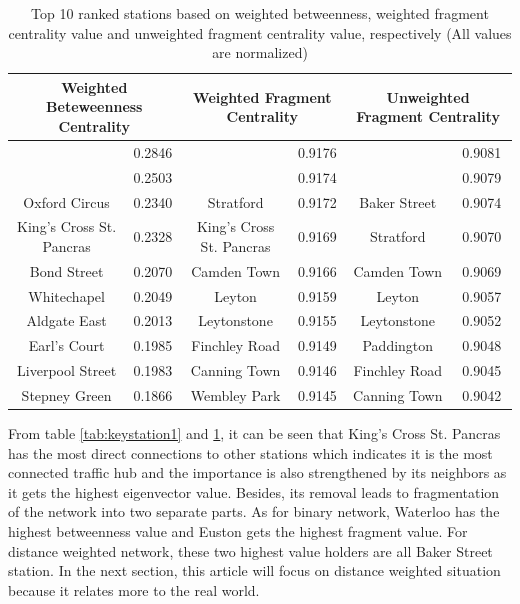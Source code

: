 \documentclass[a4paper,reqno,]{article}
\begin{document}
\begin{table}[H]
 \caption{Top 10 ranked stations based on weighted betweenness, weighted fragment centrality value and unweighted fragment centrality value, respectively (All values are normalized)}
 \label{tab:keystation2}
 \begin{center}
 \begin{tabular}{*{6}{c}}
  \toprule
  \multicolumn{2}{c}{Weighted Beteweenness Centrality} & \multicolumn{2}{c}{Weighted Fragment Centrality} & \multicolumn{2}{c}{Unweighted Fragment Centrality} \\
   \midrule
    \rowcolor{Gray}\cellcolor{Gray}{Baker Street} & 0.2846 & \cellcolor{Gray}{Baker Street} & 0.9176 & \cellcolor{Gray}{Euston} & 0.9081 \\
    \rowcolor{Gray}\cellcolor{Gray}{Bank}  & 0.2503 & \cellcolor{Gray}{Euston} & 0.9174 & \cellcolor{Gray}{King's Cross St. Pancras} & 0.9079 \\
    Oxford Circus & 0.2340 & Stratford & 0.9172 & Baker Street & 0.9074 \\
    King's Cross St. Pancras & 0.2328 & King's Cross St. Pancras & 0.9169 & Stratford & 0.9070 \\
    Bond Street & 0.2070 & Camden Town & 0.9166 & Camden Town & 0.9069 \\
    Whitechapel & 0.2049 & Leyton & 0.9159 & Leyton & 0.9057 \\
    Aldgate East & 0.2013 & Leytonstone & 0.9155 & Leytonstone & 0.9052 \\
    Earl's Court & 0.1985 & Finchley Road & 0.9149 & Paddington & 0.9048 \\
    Liverpool Street & 0.1983 & Canning Town & 0.9146 & Finchley Road & 0.9045 \\
    Stepney Green & 0.1866 & Wembley Park & 0.9145 & Canning Town & 0.9042 \\
  \bottomrule
 \end{tabular}
 \end{center}
\end{table}
From table \ref{tab:keystation1} and \ref{tab:keystation2}, it can be seen that  King's Cross St. Pancras has the most direct connections to other stations which indicates it is the most connected traffic hub and the importance is also strengthened by its neighbors as it gets the highest eigenvector value. Besides, its removal leads to fragmentation of the network into two separate parts. As for binary network, Waterloo has the highest betweenness value  and Euston gets the highest fragment value. For distance weighted network, these two highest value holders are all Baker Street station. In the next section, this article will focus on distance weighted situation because it relates more to the real world.
\end{document}
